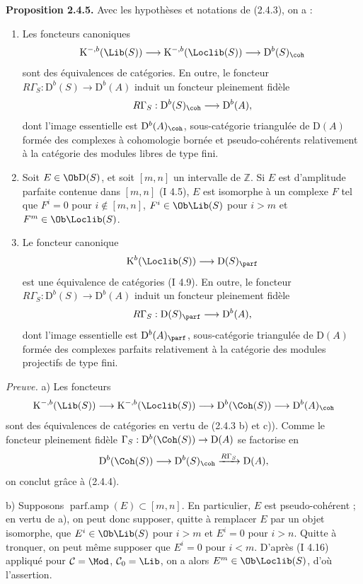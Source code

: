 \documentclass[11pt]{article}
\begin{document}
\textbf{Proposition 2.4.5.} Avec les hypothèses et notations de (2.4.3), on a :
\begin{enumerate}[label=\alph*)]
\item Les foncteurs canoniques
\[
\mathrm K^{-,b}(\Lib(S))\longrightarrow\mathrm K^{-,b}(\Loclib(S))\longrightarrow\mathrm D^b(S)_{\coh}
\]
sont des équivalences de catégories. En outre, le foncteur $R\Gamma_S:\mathrm D^b(S)\to\mathrm D^b(A)$ induit un foncteur pleinement fidèle
\[
R\Gamma_S:\mathrm D^b(S)_{\coh}\longrightarrow\mathrm D^b(A),
\]
dont l'image essentielle est $\mathrm D^b(A)_{\coh}$, sous-catégorie triangulée de $\mathrm D(A)$ formée des complexes à cohomologie bornée et pseudo-cohérents relativement à la catégorie des modules libres de type fini.
\item Soit $E\in\Ob\mathrm D(S)$, et soit $[m,n]$ un intervalle de $\mathbb Z$. Si $E$ est d'amplitude parfaite contenue dans $[m,n]$ (I 4.5), $E$ est isomorphe à un complexe $F$ tel que $F^i=0$ pour $i\notin[m,n]$, $F^i\in\Ob\Lib(S)$ pour $i>m$ et $F^m\in\Ob\Loclib(S)$.
\item Le foncteur canonique
\[
\mathrm K^b(\Loclib(S))\longrightarrow\mathrm D(S)_{\parf}
\]
est une équivalence de catégories (I 4.9). En outre, le foncteur $R\Gamma_S:\mathrm D^b(S)\to\mathrm D^b(A)$ induit un foncteur pleinement fidèle
\[
R\Gamma_S:\mathrm D(S)_{\parf}\longrightarrow\mathrm D^b(A),
\]
dont l'image essentielle est $\mathrm D^b(A)_{\parf}$, sous-catégorie triangulée de $\mathrm D(A)$ formée des complexes parfaits relativement à la catégorie des modules projectifs de type fini.
\end{enumerate}

\emph{Preuve.} a) Les foncteurs
\[
\mathrm K^{-,b}(\Lib(S))\longrightarrow\mathrm K^{-,b}(\Loclib(S))\longrightarrow\mathrm D^b(\Coh(S))\longrightarrow\mathrm D^b(A)_{\coh}
\]
sont des équivalences de catégories en vertu de (2.4.3 b) et c)). Comme le foncteur pleinement fidèle $\Gamma_S:\mathrm D^b(\Coh(S))\to\mathrm D(A)$ se factorise en
\[
\mathrm D^b(\Coh(S))\longrightarrow\mathrm D^b(S)_{\coh}\xrightarrow{R\Gamma_S}\mathrm D(A),
\]
on conclut grâce à (2.4.4).

b) Supposons $\operatorname{parf.amp}(E)\subset[m,n]$. En particulier, $E$ est pseudo-cohérent ; en vertu de a), on peut donc supposer, quitte à remplacer $E$ par un objet isomorphe, que $E^i\in\Ob\Lib(S)$ pour $i>m$ et $E^i=0$ pour $i>n$. Quitte à tronquer, on peut même supposer que $E^i=0$ pour $i<m$. D'après (I 4.16) appliqué pour $\mathcal C=\Mod$, $\mathcal C_0=\Lib$, on a alors $E^m\in\Ob\Loclib(S)$, d'où l'assertion.
\end{document}

